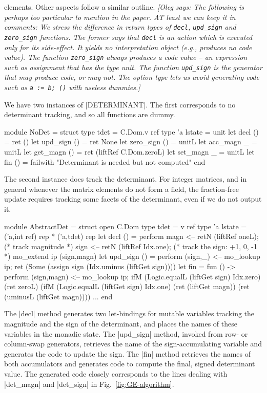 \documentclass{elsart}
\newcommand{\oleg}[1]{{\it [Oleg says: #1]}}
\begin{document}
elements. Other aspects follow a similar outline.
\oleg{The following is perhaps too particular to mention in the
  paper. AT least we can keep it in comments:
  We stress the difference in return types of \texttt{decl},
  \texttt{upd\_sign} and \texttt{zero\_sign} functions. The former says
  that \texttt{decl} is an action which is executed only for its
  side-effect. It yields no interpretation object (e.g., produces no
  code value). The function \texttt{zero\_sign} always produces a code
  value -- an expression such as assignment that has the type unit. 
  The function
  \texttt{upd\_sign} is the generator that may produce code, or may
  not. The option type lets us avoid generating code such as 
  \texttt{a := b; ()} with useless dummies.}

We have two instances of |DETERMINANT|. The first corresponds to
no determinant tracking, and so all functions are dummy.
\begin{code}
module NoDet = struct
  type tdet = C.Dom.v ref
  type 'a lstate = unit
  let decl ()      = ret ()
  let upd_sign ()  = ret None
  let zero_sign () = unitL
  let acc_magn _   = unitL
  let get_magn ()  = ret (liftRef C.Dom.zeroL)
  let set_magn _   = unitL
  let fin () = failwith "Determinant is needed but not computed"
end
\end{code}


The second instance does track the determinant. For integer matrices,
and in general whenever the matrix elements do not form a field, 
the fraction-free update requires tracking some facets of the
determinant, even if we do not output it.
\begin{code}
module AbstractDet = struct
  open C.Dom
  type tdet = v ref
  type 'a lstate = ('a,int ref) rep * ('a,tdet) rep
  let decl () = perform
      magn <-- retN (liftRef oneL);    (* track magnitude *)
      sign <-- retN (liftRef Idx.one); (* track the sign: +1, 0, -1 *)
      mo_extend ip (sign,magn)
  let upd_sign () = perform
      (sign,_) <-- mo_lookup ip;
      ret (Some (assign sign (Idx.uminus (liftGet sign))))
  let fin = fun () -> perform
      (sign,magn) <-- mo_lookup ip;
      ifM (Logic.equalL (liftGet sign) Idx.zero) (ret zeroL)
      (ifM (Logic.equalL (liftGet sign) Idx.one) (ret (liftGet magn))
          (ret (uminusL (liftGet magn))))
  ...
end
\end{code}
The |decl| method generates two let-bindings for mutable variables
tracking the magnitude and the sign of the determinant, and places the
names of these variables in the monadic state. The |upd_sign| method,
invoked from row- or column-swap generators, retrieves the name of the
sign-accumulating variable and generates the code to update the
sign. The |fin| method retrieves the names of both accumulators and
generates code to compute the final, signed determinant value.  The
generated code closely corresponds to the lines dealing with
|det_magn| and |det_sign| in Fig.~\ref{fig:GE-algorithm}.
\end{document}
